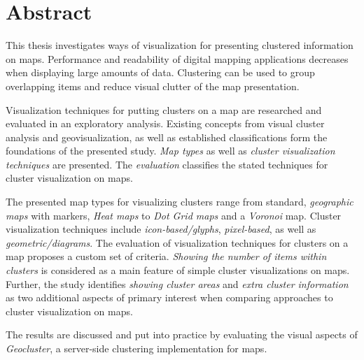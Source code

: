 
%
%


\chapter*{Abstract}

This thesis investigates ways of visualization for presenting clustered information on maps. Performance and readability of digital mapping applications decreases when displaying large amounts of data. Clustering can be used to group overlapping items and reduce visual clutter of the map presentation. 

Visualization techniques for putting clusters on a map are researched and evaluated in an exploratory analysis. Existing concepts from visual cluster analysis and geovisualization, as well as established classifications form the foundations of the presented study. \textit{Map types} as well as \textit{cluster visualization techniques} are presented. The \textit{evaluation} classifies the stated techniques for cluster visualization on maps.

The presented map types for visualizing clusters range from standard, \textit{geographic maps} with markers, \textit{Heat maps} to \textit{Dot Grid maps} and a \textit{Voronoi} map. Cluster visualization techniques include \textit{icon-based/glyphs}, \textit{pixel-based}, as well as \textit{geometric/diagrams}. The evaluation of visualization techniques for clusters on a map proposes a custom set of criteria. \textit{Showing the number of items within clusters} is considered as a main feature of simple cluster visualizations on maps. Further, the study identifies \textit{showing cluster areas} and \textit{extra cluster information} as two additional aspects of primary interest when comparing approaches to cluster visualization on maps.   

The results are discussed and put into practice by evaluating the visual aspects of \textit{Geocluster}, a server-side clustering implementation for maps.